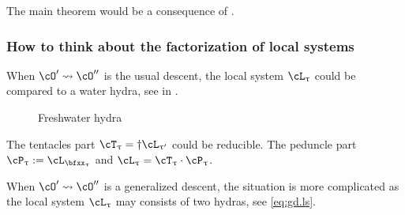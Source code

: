 \documentclass[12pt,a4paper]{amsart}
\newcommand{\bfone}{\mathbf{1}}
\numberwithin{equation}{section}
\theoremstyle{remark}
\def\LLS{\mathrm{{}^{\ell} LS}}
\let\ytb=\ytableaushort
\def\cOp{\cO^{\prime}}
\def\cOpp{\cO^{\prime\prime}}
\def\uptaup{\uptau^{\prime}}
\begin{document}

The main theorem would be a consequence of .

\subsubsection{How to think about the factorization of local systems}
When %
$\cOp\leadsto \cOpp$ is the usual descent,
the local system $\cL_{\uptau}$ could be compared to a water hydra, see in
.
\begin{figure}[pb]

  \caption{Freshwater hydra}
  \label{fig:wh}
\end{figure}

The tentacles part $\cT_{\uptau} = \dagger \cL_{\uptaup}$
could be reducible. The peduncle part $\cP_{\uptau} := \cL_{\bfxx_{\uptau}}$ and
$\cL_{\uptau} = \cT_{\uptau}\cdot \cP_{\uptau}$.


\medskip

When $\cOp\leadsto \cOpp$ is a generalized descent, the situation is more
complicated as the local system $\cL_{\uptau}$ may consists of two hydras, see \eqref{eq:gd.ls}.




\end{document}
